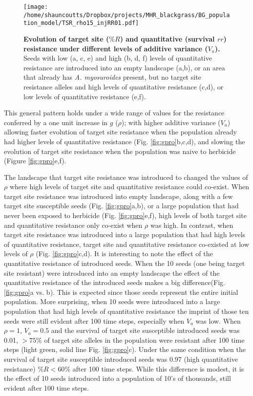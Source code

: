 \documentclass[10pt,letterpaper]{article}
\begin{document}
\begin{figure}[!h] 
	\texttt{[image: /home/shauncoutts/Dropbox/projects/MHR\_blackgrass/BG\_population\_model/TSR\_rho15\_injRR01.pdf]}
\caption{{\bf Evolution of target site ($\%R$) and quantitative (survival $rr$) resistance under different levels of additive variance ($V_a$).} Seeds with low (a, c, e) and high (b, d, f) levels of quantitative resistance are introduced into an empty landscape (a,b), or an area that already has \textit{A. myosuroides} present, but no target site resistance alleles and high levels of quantitative resistance (c,d), or low levels of quantitative resistance (e,f).} 
\label{fig:nospace_time}
\end{figure}

This general pattern holds under a wide range of values for the resistance conferred by a one unit increase in $g$ ($\rho$); with higher additive variance ($V_a$) allowing faster evolution of target site resistance when the population already had higher levels of quantitative resistance (Fig. \ref{fig:gpro}b,c,d), and slowing the evolution of target site resistance when the population was naive to herbicide (Figure \ref{fig:gpro}e,f). 

The landscape that target site resistance was introduced to changed the values of $\rho$ where high levels of target site and quantitative resistance could co-exist. When target site resistance was introduced into empty landscape, along with a few target site susceptible seeds (Fig. \ref{fig:gpro}a,b), or a large population that had never been exposed to herbicide (Fig. \ref{fig:gpro}e,f), high levels of both target site and quantitative resistance only co-exist when $\rho$ was high. In contrast, when target site resistance was introduced into a large population that had high levels of quantitative resistance, target site and quantitative resistance co-existed at low levels of $\rho$ (Fig. \ref{fig:gpro}c,d). It is interesting to note the effect of the quantitative resistance of introduced seeds. When the 10 seeds (one being target site resistant) were introduced into an empty landscape the effect of the quantitative resistance of the introduced seeds makes a big difference(Fig. \ref{fig:gpro}a vs. b). This is expected since those seeds represent the entire initial population. More surprising, when 10 seeds were introduced into a large population that had high levels of quantitative resistance the imprint of those ten seeds were still evident after 100 time steps, especially when $V_a$ was low. When $\rho = 1$, $V_a = 0.5$ and the survival of target site susceptible introduced seeds was 0.01, $>75\%$ of target site alleles in the population were resistant after 100 time steps (light green, solid line Fig. \ref{fig:gpro}c). Under the same condition when the survival of target site susceptible introduced seeds was 0.97 (high quantitative resistance) $\%R < 60\%$ after 100 time steps. While this difference is modest, it is the effect of 10 seeds introduced into a population of 10's of thousands, still evident after 100 time steps.
\end{document}
